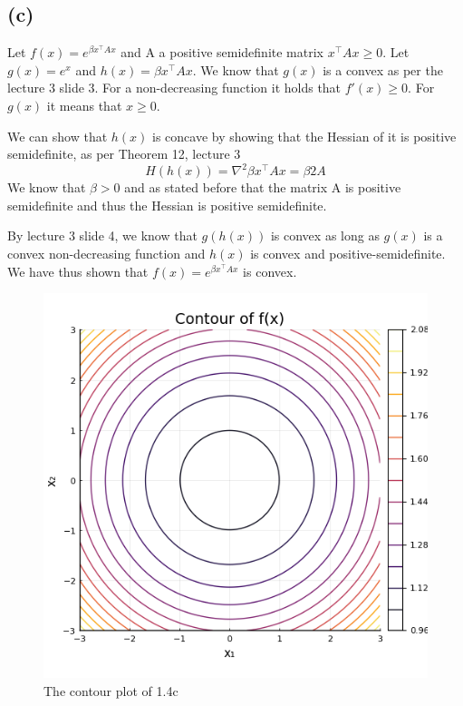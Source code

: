 \documentclass{article}
\begin{document}
	\subsection*{(c)}
	Let $f(x) = e^{\beta x^\top A x}$ and A a positive semidefinite matrix $x^\top A x \geq 0$. Let $g(x)=e^x$ and $h(x)=\beta x^\top A x$. We know that $g(x)$ is a convex as per the lecture 3 slide 3. For a non-decreasing function it holds that $f'(x)\geq 0$. For $g(x)$ it means that $x\geq 0$.
	
	We can show that $h(x)$ is concave by showing that the Hessian of it is positive semidefinite, as per Theorem 12, lecture 3
	\begin{equation}
		H(h(x)) = \nabla^2 \beta x^\top A x = \beta 2 A
	\end{equation}
	We know that $\beta > 0$ and as stated before that the matrix A is positive semidefinite and thus the Hessian is positive semidefinite.
	
	By lecture 3 slide 4, we know that $g(h(x))$ is convex as long as $g(x)$ is a convex non-decreasing function and $h(x)$ is convex and positive-semidefinite. We have thus shown that $f(x) = e^{\beta x^\top A x}$ is convex.

\begin{figure}[H]
	\centering
	\includegraphics{plots/1_4c_contour.png}
	\caption{The contour plot of 1.4c}
	\label{fig:1.4c}
\end{figure}
\end{document}
